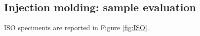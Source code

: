 \documentclass[a4paper, 11pt]{article}
\begin{document}
\subsection{Injection molding: sample evaluation}

ISO speciments are reported in Figure \ref{fig:ISO}.

\begin{figure}[htp]
\centering
{} \qquad
{} \\
\subfloat[][]

\end{figure}
\end{document}
